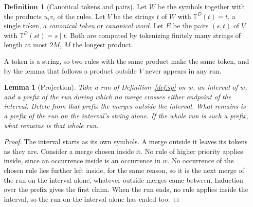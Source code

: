 \documentclass[11pt,a4paper]{article}
\theoremstyle{definition}
\newtheorem{definition}{Definition}
\theoremstyle{plain}
\newtheorem{lemma}{Lemma}
\newcommand{\T}{\mathbb{T}}
\begin{document}
\begin{definition}[Canonical tokens and pairs]\label{def:canonical}
Let \(W\) be the symbols together with the products \(u_i v_i\) of the rules. Let \(V\) be the strings \(t\) of \(W\)
with \(\T^D(t) = t\), a single token, a \emph{canonical token} or \emph{canonical word}. Let \(E\) be the pairs
\((s, t)\) of \(V\) with \(\T^D(st) = s \mid t\). Both are computed by tokenizing finitely many strings of length at
most \(2M\), \(M\) the longest product.
\end{definition}

A token is a string, so two rules with the same product make the same token, and by the lemma that follows a product
outside \(V\) never appears in any run.

\begin{lemma}[Projection]\label{lem:proj}
Take a run of Definition~\ref{def:sp} on \(w\), an interval of \(w\), and a prefix of the run during which no merge
crosses either endpoint of the interval. Delete from that prefix the merges outside the interval. What remains is a
prefix of the run on the interval's string alone. If the whole run is such a prefix, what remains is that whole run.
\end{lemma}

\begin{proof}
The interval starts as its own symbols. A merge outside it leaves its tokens as they are. Consider a merge chosen inside
it. No rule of higher priority applies inside, since an occurrence inside is an occurrence in \(w\). No occurrence of
the chosen rule lies further left inside, for the same reason, so it is the next merge of the run on the interval alone,
whatever outside merges came between. Induction over the prefix gives the first claim. When the run ends, no rule
applies inside the interval, so the run on the interval alone has ended too.
\end{proof}

\end{document}
